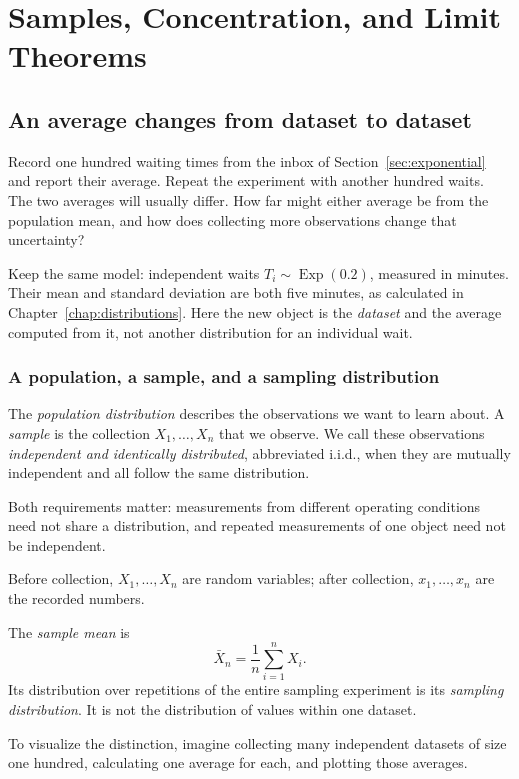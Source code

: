 \chapter{Samples, Concentration, and Limit Theorems}
\label{chap:limit-theorems}

\begingroup
{}

\section{An average changes from dataset to dataset}
\label{sec:samples}

Record one hundred waiting times from the inbox of
Section~\ref{sec:exponential} and report their average. Repeat the
experiment with another hundred waits. The two averages will usually
differ. How far might either average be from the population mean,
and how does collecting more observations change that uncertainty?

Keep the same model: independent waits
\(T_i\sim\operatorname{Exp}(0.2)\), measured in minutes. Their mean
and standard deviation are both five minutes, as calculated in
Chapter~\ref{chap:distributions}. Here the new object is the
\emph{dataset} and the average computed from it, not another distribution
for an individual wait.

\subsection{A population, a sample, and a sampling distribution}

\begin{definition}
The \emph{population distribution} describes the observations we want
to learn about. A \emph{sample} is the collection
\(X_1,\ldots,X_n\) that we observe. We call these observations
\emph{independent and identically distributed}, abbreviated i.i.d.,
when they are mutually independent and all follow the same distribution.
\end{definition}
Both requirements matter: measurements from different operating
conditions need not share a distribution, and repeated measurements
of one object need not be independent.

Before collection, \(X_1,\ldots,X_n\) are random variables; after
collection, \(x_1,\ldots,x_n\) are the recorded numbers.
\begin{definition}
The
\emph{sample mean} is
\begin{equation}
  \bar X_n=\frac1n\sum_{i=1}^n X_i.
  \label{eq:sample-mean}
\end{equation}
Its distribution over repetitions of the entire sampling experiment
is its \emph{sampling distribution}. It is not the distribution of
values within one dataset.
\end{definition}
To visualize the distinction, imagine
collecting many independent datasets of size one hundred, calculating
one average for each, and plotting those averages.

